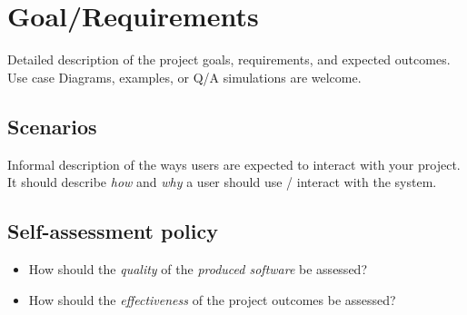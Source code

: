 \section{Goal/Requirements}

Detailed description of the project goals, requirements, and expected outcomes.
%
Use case Diagrams, examples, or Q/A simulations are welcome.

\subsection{Scenarios}

Informal description of the ways users are expected to interact with your project.
%
It should describe \emph{how} and \emph{why} a user should use / interact with the system.

\subsection{Self-assessment policy}

\begin{itemize}
    \item How should the \emph{quality} of the \emph{produced software} be assessed?
    
    \item How should the \emph{effectiveness} of the project outcomes be assessed?
\end{itemize}